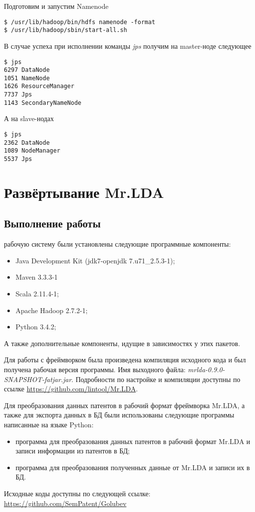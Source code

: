 Подготовим и запустим Namenode
\begin{lstlisting}
$ /usr/lib/hadoop/bin/hdfs namenode -format
$ /usr/lib/hadoop/sbin/start-all.sh
\end{lstlisting}
В случае успеха при исполнении команды \emph{jps} получим на master-ноде следующее
\begin{lstlisting}
$ jps
6297 DataNode
1051 NameNode
1626 ResourceManager
7737 Jps
1143 SecondaryNameNode
\end{lstlisting}
А на slave-нодах
\begin{lstlisting}
$ jps
2362 DataNode
1089 NodeManager
5537 Jps
\end{lstlisting}

\chapter{Развёртывание Mr.LDA}
\section{Выполнение работы}
 рабочую систему были установлены следующие программные компоненты:
\begin{itemize}
    \item Java Development Kit (jdk7-openjdk 7.u71\_2.5.3-1);
    \item Maven 3.3.3-1
    \item Scala 2.11.4-1;
    \item Apache Hadoop 2.7.2-1;
    \item Python 3.4.2;
\end{itemize}
А также дополнительные компоненты, идущие в зависимостях у этих пакетов.

Для работы с фреймворком была произведена компиляция исходного кода и был получена рабочая версия программы. 
Имя выходного файла: \emph{mrlda-0.9.0-SNAPSHOT-fatjar.jar}. Подробности по настройке и компиляции доступны 
по ссылке \url{https://github.com/lintool/Mr.LDA}.

Для преобразования данных патентов в рабочий формат фреймворка Mr.LDA, а также для экспорта данных в БД были 
использованы следующие программы написанные на языке Python:
\begin{itemize}
    \item программа для преобразования данных патентов в рабочий формат Mr.LDA и записи информации из 
        патентов в БД;
    \item программа для преобразования полученных данные от Mr.LDA и записи их в БД.
\end{itemize}
Исходные коды доступны по следующей ссылке:\\
\url{https://github.com/SemPatent/Golubev}

